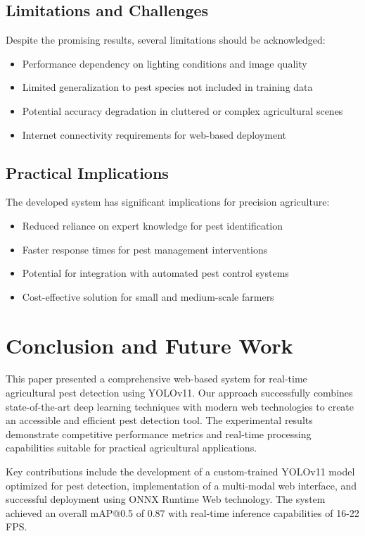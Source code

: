 \documentclass[conference]{IEEEtran}
\begin{document}
\subsection{Limitations and Challenges}

Despite the promising results, several limitations should be acknowledged:
\begin{itemize}
\item Performance dependency on lighting conditions and image quality
\item Limited generalization to pest species not included in training data
\item Potential accuracy degradation in cluttered or complex agricultural scenes
\item Internet connectivity requirements for web-based deployment
\end{itemize}

\subsection{Practical Implications}

The developed system has significant implications for precision agriculture:
\begin{itemize}
\item Reduced reliance on expert knowledge for pest identification
\item Faster response times for pest management interventions
\item Potential for integration with automated pest control systems
\item Cost-effective solution for small and medium-scale farmers
\end{itemize}

\section{Conclusion and Future Work}

This paper presented a comprehensive web-based system for real-time agricultural pest detection using YOLOv11. Our approach successfully combines state-of-the-art deep learning techniques with modern web technologies to create an accessible and efficient pest detection tool. The experimental results demonstrate competitive performance metrics and real-time processing capabilities suitable for practical agricultural applications.

Key contributions include the development of a custom-trained YOLOv11 model optimized for pest detection, implementation of a multi-modal web interface, and successful deployment using ONNX Runtime Web technology. The system achieved an overall mAP@0.5 of 0.87 with real-time inference capabilities of 16-22 FPS.
\end{document}
